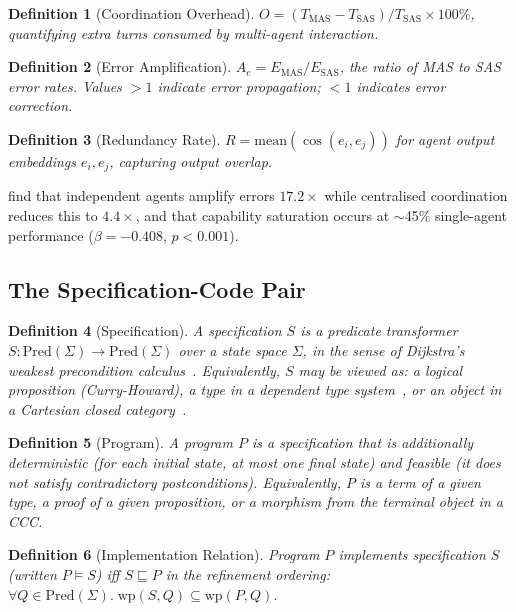 \documentclass[11pt, a4paper, copyright]{googledeepmind}
\newtheorem{definition}{Definition}[section]
\begin{document}
\begin{definition}[Coordination Overhead]
$O = (T_{\text{MAS}} - T_{\text{SAS}}) / T_{\text{SAS}} \times 100\%$, quantifying extra turns consumed by multi-agent interaction.
\end{definition}

\begin{definition}[Error Amplification]
$A_e = E_{\text{MAS}} / E_{\text{SAS}}$, the ratio of MAS to SAS error rates. Values $> 1$ indicate error propagation; $< 1$ indicates error correction.
\end{definition}

\begin{definition}[Redundancy Rate]
$R = \text{mean}(\cos(e_i, e_j))$ for agent output embeddings $e_i, e_j$, capturing output overlap.
\end{definition}

\citet{kim2025scaling} find that independent agents amplify errors $17.2\times$ while centralised coordination reduces this to $4.4\times$, and that capability saturation occurs at $\sim$45\% single-agent performance ($\beta = -0.408$, $p < 0.001$).


\subsection{The Specification-Code Pair}

\begin{definition}[Specification]
A \emph{specification} $S$ is a predicate transformer $S: \text{Pred}(\Sigma) \to \text{Pred}(\Sigma)$ over a state space $\Sigma$, in the sense of Dijkstra's weakest precondition calculus~\citep{dijkstra1976discipline}. Equivalently, $S$ may be viewed as: a logical proposition (Curry-Howard), a type in a dependent type system~\citep{martinlof1979constructive}, or an object in a Cartesian closed category~\citep{lambek1986higher}.
\end{definition}

\begin{definition}[Program]
A \emph{program} $P$ is a specification that is additionally \emph{deterministic} (for each initial state, at most one final state) and \emph{feasible} (it does not satisfy contradictory postconditions). Equivalently, $P$ is a term of a given type, a proof of a given proposition, or a morphism from the terminal object in a CCC.
\end{definition}

\begin{definition}[Implementation Relation]
Program $P$ \emph{implements} specification $S$ (written $P \models S$) iff $S \sqsubseteq P$ in the refinement ordering: $\forall Q \in \text{Pred}(\Sigma).\; \text{wp}(S, Q) \subseteq \text{wp}(P, Q)$.
\end{definition}
\end{document}
